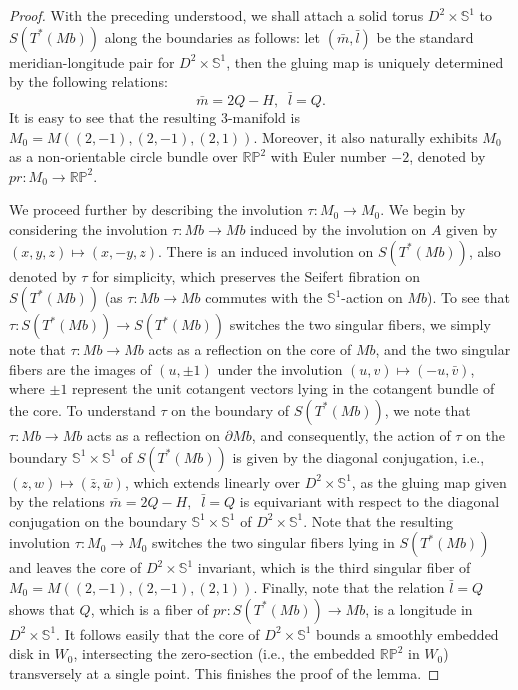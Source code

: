 \documentclass[11pt]{amsart}
\theoremstyle{plain}
\numberwithin{theorem}{section}
\theoremstyle{definition}
\newcommand{\R}{{\mathbb R}}
\renewcommand{\P}{{\mathbb P}}
\newcommand{\s}{{\mathbb S}}
\begin{document}
\begin{proof}
With the preceding understood, we shall attach a solid torus $D^2\times \s^1$ to $S(T^\ast (Mb))$
along the boundaries as follows: let $(\bar{m},\bar{l})$ be the standard meridian-longitude pair for 
$D^2\times \s^1$, then the gluing map is uniquely determined by the following relations:
$$
\bar{m}=2Q-H, \;\; \bar{l}=Q.
$$
It is easy to see that the resulting $3$-manifold is $M_0=M((2,-1), (2,-1), (2,1))$. 
Moreover, it also naturally exhibits $M_0$ as a non-orientable circle bundle over $\R\P^2$ with Euler
number $-2$, denoted by $pr: M_0\rightarrow \R\P^2$. 

We proceed further by describing the involution $\tau: M_0\rightarrow M_0$. We begin by considering 
the involution $\tau: Mb\rightarrow Mb$ induced by the involution on $A$ given by $(x,y,z)\mapsto (x,-y,z)$. There is an induced involution on $S(T^\ast (Mb))$, also denoted by $\tau$ for simplicity, which preserves the Seifert fibration on $S(T^\ast (Mb))$ (as $\tau: Mb\rightarrow Mb$ commutes with the $\s^1$-action on $Mb$). To see that $\tau: S(T^\ast (Mb))\rightarrow S(T^\ast (Mb))$ switches the two singular fibers, we simply note that $\tau: Mb\rightarrow Mb$ acts as a reflection on the core of $Mb$,
and the two singular fibers are the images of $(u,\pm 1)$ under the involution 
$(u,v)\mapsto (-u,\bar{v})$, where $\pm 1$ represent the unit cotangent vectors lying in the cotangent bundle of the core. 
To understand $\tau$ on the boundary of $S(T^\ast (Mb))$, we note that $\tau: Mb\rightarrow Mb$ acts as a reflection on $\partial Mb$, and consequently, the action of $\tau$ on the boundary $\s^1\times \s^1$ of $S(T^\ast (Mb))$ is given by the diagonal conjugation, i.e., $(z,w)\mapsto (\bar{z},\bar{w})$,
which extends linearly over $D^2\times \s^1$, as the gluing map given by the relations 
$\bar{m}=2Q-H, \;\; \bar{l}=Q$ is equivariant with respect to the diagonal conjugation on the boundary 
$\s^1\times \s^1$ of $D^2\times \s^1$. Note that the resulting involution $\tau: M_0\rightarrow M_0$
switches the two singular fibers lying in $S(T^\ast (Mb))$ and leaves the core of $D^2\times \s^1$
invariant, which is the third singular fiber of $M_0=M((2,-1), (2,-1), (2,1))$. Finally, note that 
the relation $\bar{l}=Q$ shows that $Q$, which is a fiber of $pr: S(T^\ast (Mb))\rightarrow Mb$,
is a longitude in $D^2\times \s^1$. It follows easily that the core of $D^2\times \s^1$ bounds a 
smoothly embedded disk in $W_0$, intersecting the zero-section (i.e., the embedded $\R\P^2$ in $W_0$) transversely at a single point. This finishes the proof of the lemma. 

\end{proof}
\end{document}
